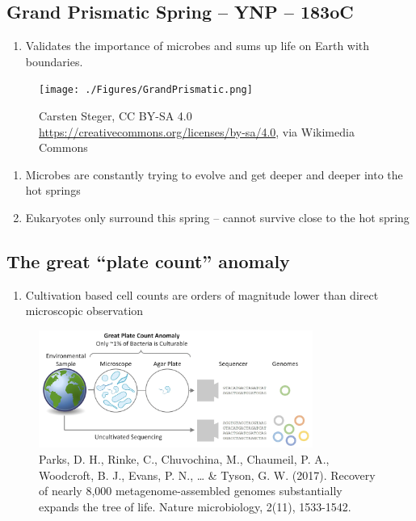 \documentclass[
]{book}
\providecommand{\tightlist}{%
  \setlength{\itemsep}{0pt}\setlength{\parskip}{0pt}}
\begin{document}
\hypertarget{grand-prismatic-spring-ynp-183oc}{%
\subsection*{Grand Prismatic Spring -- YNP -- 183oC}\label{grand-prismatic-spring-ynp-183oc}}

\begin{enumerate}
\def\labelenumi{\arabic{enumi}.}
\tightlist
\item
  Validates the importance of microbes and sums up life on Earth with boundaries.
\end{enumerate}

\begin{figure}
\centering
\texttt{[image: ./Figures/GrandPrismatic.png]}
\caption{Carsten Steger, CC BY-SA 4.0 \url{https://creativecommons.org/licenses/by-sa/4.0}, via Wikimedia Commons}
\end{figure}

\begin{enumerate}
\def\labelenumi{\arabic{enumi}.}
\setcounter{enumi}{1}
\item
  Microbes are constantly trying to evolve and get deeper and deeper into the hot springs
\item
  Eukaryotes only surround this spring -- cannot survive close to the hot spring
\end{enumerate}

\hypertarget{the-great-plate-count-anomaly}{%
\subsection{The great ``plate count'' anomaly}\label{the-great-plate-count-anomaly}}

\begin{enumerate}
\def\labelenumi{\arabic{enumi}.}
\tightlist
\item
  Cultivation based cell counts are orders of magnitude lower than direct microscopic observation
\end{enumerate}

\begin{figure}
\centering
\includegraphics[width=0.8\textwidth,height=\textheight]{./Figures/PlateCount.png}
\caption{Parks, D. H., Rinke, C., Chuvochina, M., Chaumeil, P. A., Woodcroft, B. J., Evans, P. N., \ldots{} \& Tyson, G. W. (2017). Recovery of nearly 8,000 metagenome-assembled genomes substantially expands the tree of life. Nature microbiology, 2(11), 1533-1542.}
\end{figure}
\end{document}
